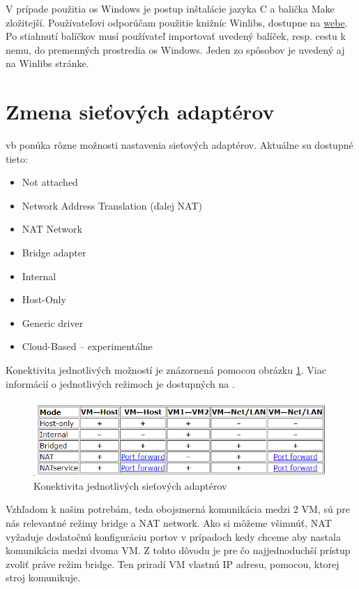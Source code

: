 V prípade použitia \acrshort{os} Windows je postup inštalácie jazyka C a balička Make zložitejší. Používateľovi odporúčam použitie knižníc Winlibs, dostupne na \href{https://winlibs.com/}{webe}. Po stiahnutí balíčkov musí používateľ importovať uvedený balíček, resp. cestu k nemu, do premenných prostredia \acrshort{os} Windows. Jeden zo spôsobov je uvedený aj na Winlibs stránke. 

\section{Zmena sieťových adaptérov}
\acrshort{vb} ponúka rôzne možnosti nastavenia sieťových adaptérov. Aktuálne su dostupné tieto:
\begin{itemize}
	\item{Not attached}
	\item{Network Address Translation (ďalej NAT)}
	\item{NAT Network}
	\item{Bridge adapter}
	\item{Internal}
	\item{Host-Only}
	\item{Generic driver}
	\item{Cloud-Based} -- experimentálne
\end{itemize} 
 
Konektivita jednotlivých možností je znázornená pomocou obrázku \ref{vbmode}. Viac informácií o jednotlivých režimoch je dostupných na \cite{vboracle}.

\begin{figure}
	\centering
	\includegraphics[width=.9\textwidth]{figures/vbmodes}
	\caption{Konektivita jednotlivých sieťových adaptérov}
	\label{vbmode}
\end{figure}
Vzhľadom k našim potrebám, teda obojsmerná komunikácia medzi 2 VM, sú pre nás relevantné režimy bridge a NAT network. Ako si môžeme všimnúť, NAT vyžaduje dodatočnú konfiguráciu portov v prípadoch kedy chceme aby nastala komunikácia medzi dvoma VM. Z tohto dôvodu je pre čo najjednoduchší prístup zvoliť práve režim bridge. Ten priradí VM vlastnú IP adresu, pomocou, ktorej stroj komunikuje. 

